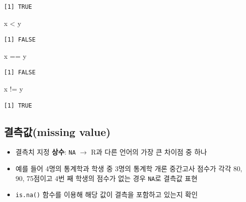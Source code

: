 \documentclass[
  11pt,
]{krantz}
\newenvironment{Shaded}{\begin{snugshade}}{\end{snugshade}}
\newcommand{\NormalTok}[1]{#1}
\newcommand{\SpecialCharTok}[1]{\textcolor[rgb]{0,0,0}{#1}}
\providecommand{\tightlist}{%
  \setlength{\itemsep}{0pt}\setlength{\parskip}{0pt}}
\begin{document}
\begin{verbatim}
[1] TRUE
\end{verbatim}

\begin{Shaded}
\begin{Highlighting}[]
\NormalTok{x }\SpecialCharTok{\textless{}}\NormalTok{ y}
\end{Highlighting}
\end{Shaded}

\begin{verbatim}
[1] FALSE
\end{verbatim}

\begin{Shaded}
\begin{Highlighting}[]
\NormalTok{x }\SpecialCharTok{==}\NormalTok{ y}
\end{Highlighting}
\end{Shaded}

\begin{verbatim}
[1] FALSE
\end{verbatim}

\begin{Shaded}
\begin{Highlighting}[]
\NormalTok{x }\SpecialCharTok{!=}\NormalTok{ y}
\end{Highlighting}
\end{Shaded}

\begin{verbatim}
[1] TRUE
\end{verbatim}

\normalsize

\hypertarget{missing-value}{%
\subsection{결측값(missing value)}\label{missing-value}}

\begin{itemize}
\tightlist
\item
  결측치 지정 \textbf{상수}: \texttt{NA} \(\rightarrow\) R과 다른 언어의 가장 큰 차이점 중 하나
\item
  예를 들어 4명의 통계학과 학생 중 3명의 통계학 개론 중간고사 점수가 각각 80, 90, 75점이고 4번 째 학생의 점수가 없는 경우 \texttt{NA}로 결측값 표현
\item
  \texttt{is.na()} 함수를 이용해 해당 값이 결측을 포함하고 있는지 확인
\end{itemize}

\footnotesize
\end{document}
